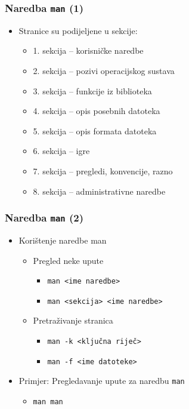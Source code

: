 \documentclass{beamer}
\newcommand{\shell}[1]{\texttt{#1}}
\begin{document}
\begin{frame}[t]
\frametitle{Naredba \shell{man} (1)}
\begin{itemize}
  \item Stranice su podijeljene u sekcije:
  \begin{itemize}
    \item 1. sekcija – korisničke naredbe
    \item 2. sekcija – pozivi operacijskog sustava
    \item 3. sekcija – funkcije iz biblioteka
    \item 4. sekcija – opis posebnih datoteka
    \item 5. sekcija – opis formata datoteka
    \item 6. sekcija – igre
    \item 7. sekcija – pregledi, konvencije, razno
    \item 8. sekcija – administrativne naredbe
  \end{itemize}
\end{itemize}
\end{frame}

\begin{frame}[t]
\frametitle{Naredba \shell{man} (2)}
\begin{itemize}
  \item Korištenje naredbe man
  \begin{itemize}
    \item Pregled neke upute
    \begin{itemize}
      \item \shell{man <ime naredbe>}
      \item \shell{man <sekcija> <ime naredbe>}
    \end{itemize}
    \item Pretraživanje stranica
    \begin{itemize}
      \item \shell{man -k <ključna riječ>}
      \item \shell{man -f <ime datoteke>}
    \end{itemize}
  \end{itemize}
  \item Primjer: Pregledavanje upute za naredbu \shell{man}
  \begin{itemize}
    \item \shell{man man}
  \end{itemize}
\end{itemize}
\end{frame}
\end{document}
